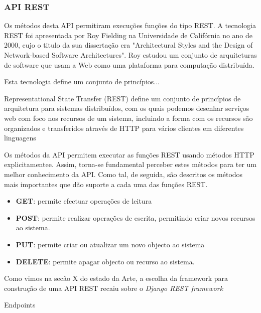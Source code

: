 \subsubsection{\acs{API} \acs{REST}}


Os métodos desta API permitiram execuções funções do tipo \ac{REST}. A tecnologia \ac{REST} foi apresentada por Roy Fielding na Universidade de Califórnia no ano de 2000, cujo o titulo da sua dissertação era "Architectural Styles and the Design of Network-based Software Architectures". Roy estudou um conjunto de arquiteturas de software que usam a Web como uma plataforma para computação distribuída\cite{Rodriguez2015}. 

 
 
Esta tecnologia define um conjunto de princípios...   

 
Representational State Transfer (REST) define um conjunto de princípios de arquitetura para
sistemas distribuídos, com os quais podemos desenhar serviços web com foco nos recursos de um
sistema, incluindo a forma com os recursos são organizados e transferidos através de HTTP para
vários clientes em diferentes linguagens




Os métodos da API permitem executar as funções REST usando métodos HTTP explicitamentee. Assim, torna-se fundamental perceber estes métodos para ter um melhor conhecimento da API. Como tal, de seguida, são descritos os métodos mais importantes que dão suporte a cada uma das funções REST.


\begin{itemize}
	\item \textbf{GET}: permite efectuar operações de leitura 
	\item \textbf{POST}: permite realizar operações de escrita, permitindo criar novos recursos ao sistema.
	\item \textbf{PUT}: permite criar ou atualizar um novo objecto ao sistema 
	\item \textbf{DELETE}: permite apagar objecto ou recurso ao sistema. 
\end{itemize}







Como vimos na secão X do estado da Arte, a escolha da framework para construção de uma \ac{API} \ac{REST} recaiu sobre o \textit{Django REST framework}



Endpoints 





